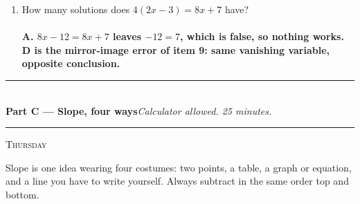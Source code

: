 \documentclass[11pt,a4paper]{article}
\newcommand{\PartHead}[2]{%
  \vspace{6pt}
  {\color{navy}\rule{\textwidth}{0.8pt}}\\[2pt]
  {\large\bfseries\color{navy}#1}\hfill{\small\itshape #2}\\[-4pt]
  {\color{navy}\rule{\textwidth}{0.4pt}}
  \vspace{4pt}
}
\newcommand{\sitting}[1]{{\footnotesize\textsc{\color{navy}#1}}\par\vspace{2pt}}
\newcommand{\ans}[1]{\ {\color{keyred}\bfseries #1}}
\newcommand{\ans}[1]{}
\begin{document}
\begin{enumerate}[leftmargin=20pt,itemsep=9pt]
\item How many solutions does $4(2x-3)=8x+7$ have?\\
  \ans{\\ A. $8x-12=8x+7$ leaves $-12=7$, which is false, so nothing works. D is the
  mirror-image error of item 9: same vanishing variable, opposite conclusion.}
\end{enumerate}

\newpage
\PartHead{Part C --- Slope, four ways}{Calculator allowed. 25 minutes.}
\sitting{Thursday}
Slope is one idea wearing four costumes: two points, a table, a graph or equation, and
a line you have to write yourself. Always subtract in the same order top and bottom.
\end{document}
